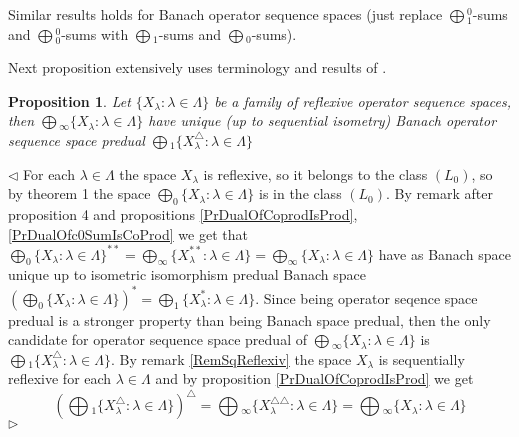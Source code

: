 \documentclass[12pt]{article}
\newtheorem{proposition}[theorem]{Proposition}
\newenvironment{proof}{\par $\triangleleft$}{$\triangleright$}
\begin{document}
Similar results holds for Banach operator sequence spaces (just replace $\bigoplus{}_1^0$-sums and $\bigoplus{}_0^0$-sums with $\bigoplus{}_1$-sums and $\bigoplus{}_0$-sums).

Next proposition extensively uses terminology and results of \cite{BrownItoUniquePredual}.

\begin{proposition}\label{PrUniquePredualForCoproduct}
Let $\{X_\lambda:\lambda\in\Lambda\}$ be a family of reflexive operator sequence spaces, then $\bigoplus{}_\infty\{X_\lambda:\lambda\in\Lambda\}$ have unique (up to sequential isometry) Banach operator sequence space predual $\bigoplus{}_1\{X_\lambda^\triangle:\lambda\in\Lambda\}$
\end{proposition} 
\begin{proof} For each $\lambda\in\Lambda$ the space $X_\lambda$ is reflexive, so it belongs to the class $(L_0)$, so by theorem 1 \cite{BrownItoUniquePredual} the space $\bigoplus_0\{X_\lambda:\lambda\in\Lambda\}$ is in the class $(L_0)$. By remark after proposition 4 \cite{BrownItoUniquePredual} and propositions \ref{PrDualOfCoprodIsProd}, \ref{PrDualOfc0SumIsCoProd} we get that $\bigoplus_0\{X_\lambda:\lambda\in\Lambda\}^{**}=\bigoplus_\infty\{X_\lambda^{**}:\lambda\in\Lambda\}=\bigoplus_\infty\{X_\lambda:\lambda\in\Lambda\}$ have as Banach space unique up to isometric isomorphism predual Banach space $(\bigoplus_0\{X_\lambda:\lambda\in\Lambda\})^{*}=\bigoplus_1\{X_\lambda^{*}:\lambda\in\Lambda\}$. Since being operator seqence space predual is a stronger property than being Banach space predual, then the only candidate for operator sequence space predual of $\bigoplus{}_\infty\{X_\lambda:\lambda\in\Lambda\}$ is $\bigoplus{}_1\{X_\lambda^\triangle:\lambda\in\Lambda\}$. By remark \ref{RemSqReflexiv} the space $X_\lambda$ is sequentially reflexive for each $\lambda\in\Lambda$ and by proposition \ref{PrDualOfCoprodIsProd} we get
$$
\left(\bigoplus{}_1\{X_\lambda^\triangle:\lambda\in\Lambda\}\right)^\triangle
=\bigoplus{}_\infty\{X_\lambda^{\triangle\triangle}:\lambda\in\Lambda\}
=\bigoplus{}_\infty\{X_\lambda:\lambda\in\Lambda\}
$$
\end{proof}
\end{document}
